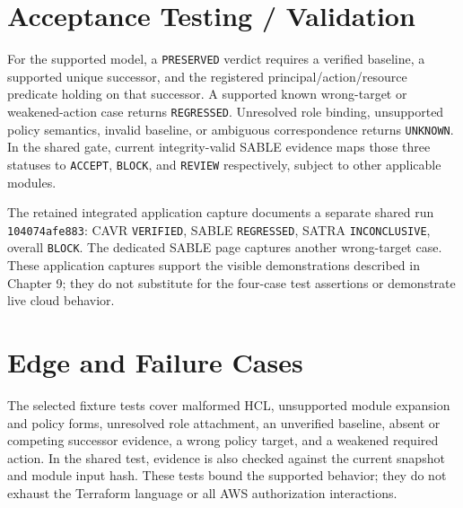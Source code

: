 


\section{Acceptance Testing / Validation}
\begin{sloppypar}
For the supported model, a \texttt{PRESERVED} verdict requires a verified baseline, a supported unique successor, and the registered principal/action/resource predicate holding on that successor. A supported known wrong-target or weakened-action case returns \texttt{REGRESSED}. Unresolved role binding, unsupported policy semantics, invalid baseline, or ambiguous correspondence returns \texttt{UNKNOWN}. In the shared gate, current integrity-valid SABLE evidence maps those three statuses to \texttt{ACCEPT}, \texttt{BLOCK}, and \texttt{REVIEW} respectively, subject to other applicable modules.
\end{sloppypar}

\begin{sloppypar}
The retained integrated application capture documents a separate shared run \texttt{104074afe883}: CAVR \texttt{VERIFIED}, SABLE \texttt{REGRESSED}, SATRA \texttt{INCONCLUSIVE}, overall \texttt{BLOCK}. The dedicated SABLE page captures another wrong-target case. These application captures support the visible demonstrations described in Chapter 9; they do not substitute for the four-case test assertions or demonstrate live cloud behavior.
\end{sloppypar}

\section{Edge and Failure Cases}
The selected fixture tests cover malformed HCL, unsupported module expansion and policy forms, unresolved role attachment, an unverified baseline, absent or competing successor evidence, a wrong policy target, and a weakened required action. In the shared test, evidence is also checked against the current snapshot and module input hash. These tests bound the supported behavior; they do not exhaust the Terraform language or all AWS authorization interactions.

